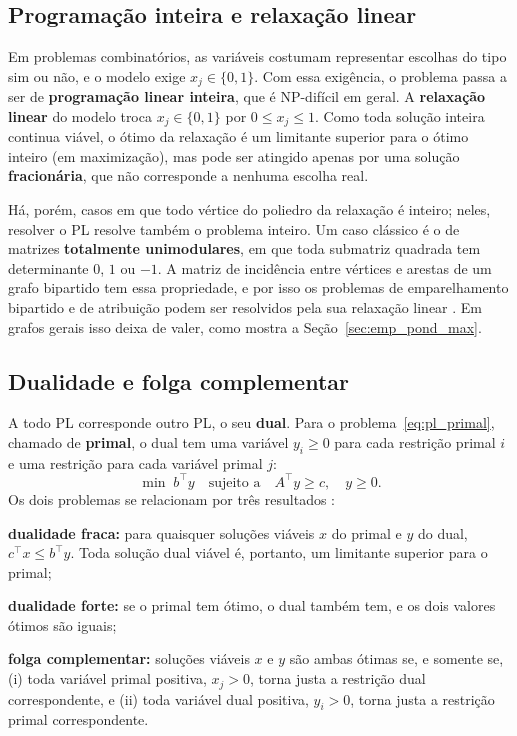 \subsection{Programação inteira e relaxação linear}
\label{sec:pl_inteira}

Em problemas combinatórios, as variáveis costumam representar escolhas do tipo sim ou não, e o modelo exige $x_j \in \{0, 1\}$. Com essa exigência, o problema passa a ser de \textbf{programação linear inteira}, que é NP-difícil em geral. A \textbf{relaxação linear} do modelo troca $x_j \in \{0, 1\}$ por $0 \le x_j \le 1$. Como toda solução inteira continua viável, o ótimo da relaxação é um limitante superior para o ótimo inteiro (em maximização), mas pode ser atingido apenas por uma solução \textbf{fracionária}, que não corresponde a nenhuma escolha real.

Há, porém, casos em que todo vértice do poliedro da relaxação é inteiro; neles, resolver o PL resolve também o problema inteiro. Um caso clássico é o de matrizes \textbf{totalmente unimodulares}, em que toda submatriz quadrada tem determinante $0$, $1$ ou $-1$. A matriz de incidência entre vértices e arestas de um grafo bipartido tem essa propriedade, e por isso os problemas de emparelhamento bipartido e de atribuição podem ser resolvidos pela sua relaxação linear \cite{schrijver}. Em grafos gerais isso deixa de valer, como mostra a Seção~\ref{sec:emp_pond_max}.

\subsection{Dualidade e folga complementar}
\label{sec:pl_dualidade}

A todo PL corresponde outro PL, o seu \textbf{dual}. Para o problema~\eqref{eq:pl_primal}, chamado de \textbf{primal}, o dual tem uma variável $y_i \ge 0$ para cada restrição primal $i$ e uma restrição para cada variável primal $j$:
\begin{equation}
    \min \; b^{\top} y \quad \text{sujeito a} \quad A^{\top} y \ge c, \quad y \ge 0.
    \label{eq:pl_dual}
\end{equation}
Os dois problemas se relacionam por três resultados \cite{cormen}:
\begin{alineas}
    \item \textbf{dualidade fraca:} para quaisquer soluções viáveis $x$ do primal e $y$ do dual, $c^{\top} x \le b^{\top} y$. Toda solução dual viável é, portanto, um limitante superior para o primal;
    \item \textbf{dualidade forte:} se o primal tem ótimo, o dual também tem, e os dois valores ótimos são iguais;
    \item \textbf{folga complementar:} soluções viáveis $x$ e $y$ são ambas ótimas se, e somente se, (i) toda variável primal positiva, $x_j > 0$, torna justa a restrição dual correspondente, e (ii) toda variável dual positiva, $y_i > 0$, torna justa a restrição primal correspondente.
\end{alineas}

